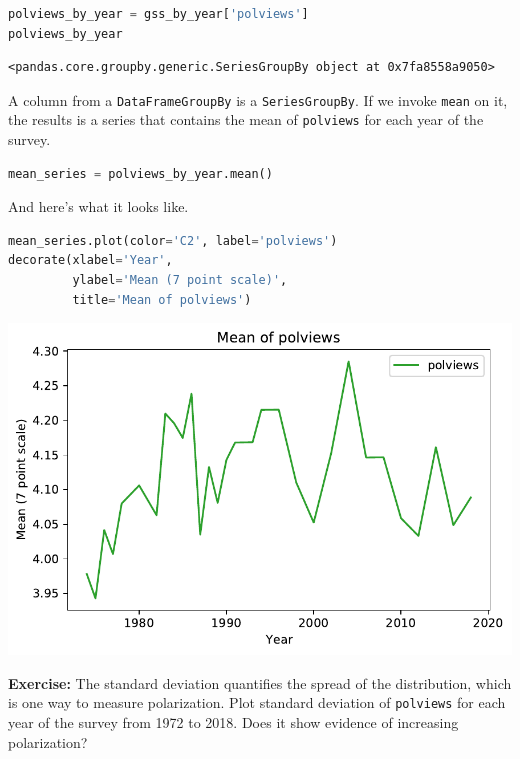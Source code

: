 \begin{lstlisting}[language=Python]
polviews_by_year = gss_by_year['polviews']
polviews_by_year
\end{lstlisting}

\begin{lstlisting}[]
<pandas.core.groupby.generic.SeriesGroupBy object at 0x7fa8558a9050>
\end{lstlisting}

A column from a \passthrough{\lstinline!DataFrameGroupBy!} is a
\passthrough{\lstinline!SeriesGroupBy!}. If we invoke
\passthrough{\lstinline!mean!} on it, the results is a series that
contains the mean of \passthrough{\lstinline!polviews!} for each year of
the survey.

\begin{lstlisting}[language=Python]
mean_series = polviews_by_year.mean()
\end{lstlisting}

And here's what it looks like.

\begin{lstlisting}[language=Python]
mean_series.plot(color='C2', label='polviews')
decorate(xlabel='Year', 
         ylabel='Mean (7 point scale)',
         title='Mean of polviews')
\end{lstlisting}

\begin{center}
\includegraphics[scale=0.75]{chapters/02_polviews_soln_files/02_polviews_soln_50_0.pdf}
\end{center}

\textbf{Exercise:} The standard deviation quantifies the spread of the
distribution, which is one way to measure polarization. Plot standard
deviation of \passthrough{\lstinline!polviews!} for each year of the
survey from 1972 to 2018. Does it show evidence of increasing
polarization?

